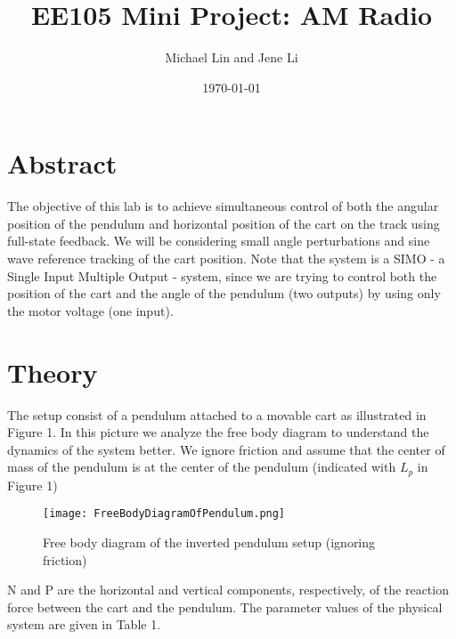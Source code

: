 \documentclass[11pt, twoside, letterpaper]{article}   	%
\title{EE105 Mini Project: AM Radio}
\author{Michael Lin and Jene Li}
\date{\today}							%
\begin{document}
\maketitle

\newcommand\Laplace{\mathcal{L}}
\newcommand\Taylor{\mathcal{T}}

\section{Abstract}
The objective of this lab is to achieve simultaneous control of both the angular position of the pendulum
and horizontal position of the cart on the track using full-state feedback. We will be considering small
angle perturbations and sine wave reference tracking of the cart position. Note that the system is a SIMO
- a Single Input Multiple Output - system, since we are trying to control both the position of the cart
and the angle of the pendulum (two outputs) by using only the motor voltage (one input).

\section{Theory}
The setup consist of a pendulum attached to a movable cart as illustrated in Figure 1. In this picture
we analyze the free body diagram to understand the dynamics of the system better. We ignore friction
and assume that the center of mass of the pendulum is at the center of the pendulum (indicated with
$L_p$ in Figure 1)

\begin{figure}[htbp]
\begin{center}
\texttt{[image: FreeBodyDiagramOfPendulum.png]}
\caption{Free body diagram of the inverted pendulum setup (ignoring friction)}
\label{default}
\end{center}
\end{figure}
\FloatBarrier

N and P are the horizontal and vertical components, respectively, of the reaction force between the cart and the
pendulum. The parameter values of the physical system are given in Table 1.
\end{document}
